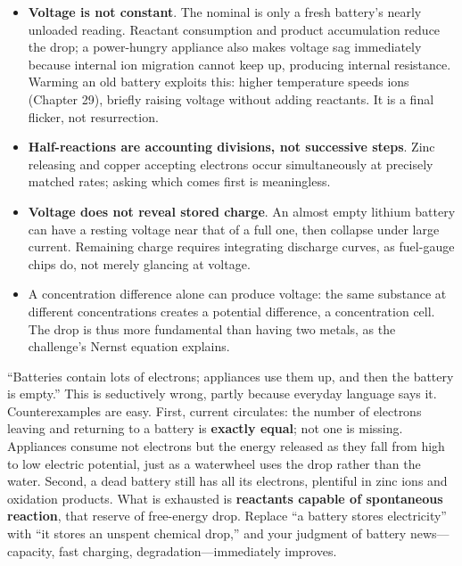 \begin{itemize}[itemsep=2pt]
\item \textbf{Voltage is not constant}. The nominal  is only a fresh battery's nearly unloaded reading. Reactant consumption and product accumulation reduce the drop; a power-hungry appliance also makes voltage sag immediately because internal ion migration cannot keep up, producing internal resistance. Warming an old battery exploits this: higher temperature speeds ions (Chapter 29), briefly raising voltage without adding reactants. It is a final flicker, not resurrection.
\item \textbf{Half-reactions are accounting divisions, not successive steps}. Zinc releasing and copper accepting electrons occur simultaneously at precisely matched rates; asking which comes first is meaningless.
\item \textbf{Voltage does not reveal stored charge}. An almost empty lithium battery can have a resting voltage near that of a full one, then collapse under large current. Remaining charge requires integrating discharge curves, as fuel-gauge chips do, not merely glancing at voltage.
\item A concentration difference alone can produce voltage: the same substance at different concentrations creates a potential difference, a concentration cell. The drop is thus more fundamental than having two metals, as the challenge's Nernst equation explains.
\end{itemize}

\begin{wuqu}
``Batteries contain lots of electrons; appliances use them up, and then the battery is empty.'' This is seductively wrong, partly because everyday language says it. Counterexamples are easy. First, current circulates: the number of electrons leaving and returning to a battery is \textbf{exactly equal}; not one is missing. Appliances consume not electrons but the energy released as they fall from high to low electric potential, just as a waterwheel uses the drop rather than the water. Second, a dead battery still has all its electrons, plentiful in zinc ions and oxidation products. What is exhausted is \textbf{reactants capable of spontaneous reaction}, that reserve of free-energy drop. Replace ``a battery stores electricity'' with ``it stores an unspent chemical drop,'' and your judgment of battery news---capacity, fast charging, degradation---immediately improves.
\end{wuqu}

